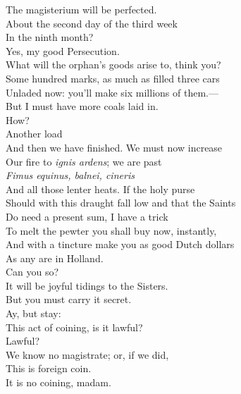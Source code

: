 \documentclass[a4paper,oneside,12pt]{memoir}
\begin{document}
\begin{drama*}
The magisterium will be perfected.\\
\persecutionspeaks About the second day of the third week\\
In the ninth month?\\
\subtlespeaks {} Yes, my good Persecution.\\
\tribulationspeaks What will the orphan's goods arise to, think you?\\
\subtlespeaks Some hundred marks, as much as filled three cars\\
Unladed now: you'll make six millions of them.---\\
But I must have more coals laid in.\\
\tribulationspeaks {} How?\\
\subtlespeaks {} Another load\\
And then we have finished. We must now increase\\
Our fire to \emph{ignis ardens}; we are past\\
\emph{Fimus equinus, balnei, cineris}\\
And all those lenter heats. If the holy purse\\
Should with this draught fall low and that the Saints\\
Do need a present sum, I have a trick\\
To melt the pewter you shall buy now, instantly,\\
And with a tincture make you as good Dutch dollars\\
As any are in Holland.\\
\tribulationspeaks {} Can you so?\\
\persecutionspeaks It will be joyful tidings to the Sisters.\\
\subtlespeaks But you must carry it secret.\\
\tribulationspeaks {} Ay, but stay:\\
This act of coining, is it lawful?\\
\persecutionspeaks {} Lawful?\\
We know no magistrate; or, if we did,\\
This is foreign coin.\\
\subtlespeaks {} It is no coining, madam.\\

\end{drama*}
\end{document}
